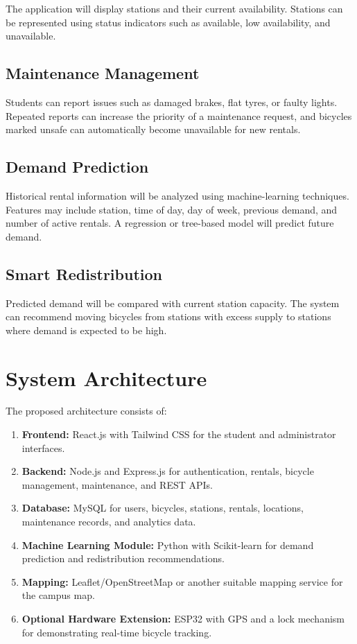 \documentclass[12pt,a4paper]{article}
\begin{document}
The application will display stations and their current availability. Stations can be represented using status indicators such as available, low availability, and unavailable.

\subsection{Maintenance Management}

Students can report issues such as damaged brakes, flat tyres, or faulty lights. Repeated reports can increase the priority of a maintenance request, and bicycles marked unsafe can automatically become unavailable for new rentals.

\subsection{Demand Prediction}

Historical rental information will be analyzed using machine-learning techniques. Features may include station, time of day, day of week, previous demand, and number of active rentals. A regression or tree-based model will predict future demand.

\subsection{Smart Redistribution}

Predicted demand will be compared with current station capacity. The system can recommend moving bicycles from stations with excess supply to stations where demand is expected to be high.

\section{System Architecture}

The proposed architecture consists of:

\begin{enumerate}[leftmargin=*]
    \item \textbf{Frontend:} React.js with Tailwind CSS for the student and administrator interfaces.
    \item \textbf{Backend:} Node.js and Express.js for authentication, rentals, bicycle management, maintenance, and REST APIs.
    \item \textbf{Database:} MySQL for users, bicycles, stations, rentals, locations, maintenance records, and analytics data.
    \item \textbf{Machine Learning Module:} Python with Scikit-learn for demand prediction and redistribution recommendations.
    \item \textbf{Mapping:} Leaflet/OpenStreetMap or another suitable mapping service for the campus map.
    \item \textbf{Optional Hardware Extension:} ESP32 with GPS and a lock mechanism for demonstrating real-time bicycle tracking.
\end{enumerate}
\end{document}
